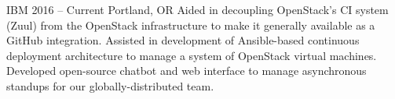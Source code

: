 {IBM}
{2016 -- Current}
{Portland, OR}
{Aided in decoupling OpenStack's CI system (Zuul) from the OpenStack infrastructure to make it generally available as a GitHub integration. Assisted in development of Ansible-based continuous deployment architecture to manage a system of OpenStack virtual machines. Developed open-source chatbot and web interface to manage asynchronous standups for our globally-distributed team.}
